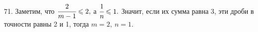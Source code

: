 71. Заметим, что $\cfrac{2}{m-1}\leqslant2,$ а $\cfrac{1}{n}\leqslant1.$ Значит, если их сумма равна 3, эти дроби в точности равны 2 и 1, тогда $m=2,\ n=1.$\\
